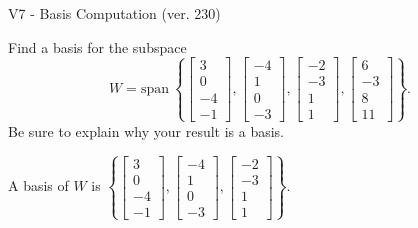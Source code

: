 \begin{exercise}
  \begin{exerciseTitle}V7 - Basis Computation (ver. 230)\end{exerciseTitle}
  \begin{exerciseStatement}
    Find a basis for the subspace 
\[W=\mathrm{span}\ \left\{\left[\begin{array}{r}
3 \\
0 \\
-4 \\
-1
\end{array}\right] , \left[\begin{array}{r}
-4 \\
1 \\
0 \\
-3
\end{array}\right] , \left[\begin{array}{r}
-2 \\
-3 \\
1 \\
1
\end{array}\right] , \left[\begin{array}{r}
6 \\
-3 \\
8 \\
11
\end{array}\right]\right\}.\]
 Be sure to explain why your result is a basis.


  \end{exerciseStatement}
  \begin{exerciseAnswer}
   A basis of \(W\) is  \(\left\{\left[\begin{array}{r}
3 \\
0 \\
-4 \\
-1
\end{array}\right] , \left[\begin{array}{r}
-4 \\
1 \\
0 \\
-3
\end{array}\right] , \left[\begin{array}{r}
-2 \\
-3 \\
1 \\
1
\end{array}\right]\right\}\).
  


  \end{exerciseAnswer}
\end{exercise}